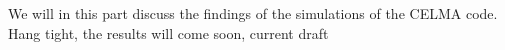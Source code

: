 We will in this part discuss the findings of the simulations of the CELMA code.
Hang tight, the results will come soon, current draft
